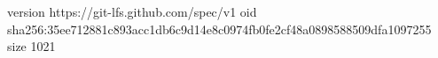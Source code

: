 version https://git-lfs.github.com/spec/v1
oid sha256:35ee712881c893acc1db6c9d14e8c0974fb0fe2cf48a0898588509dfa1097255
size 1021
